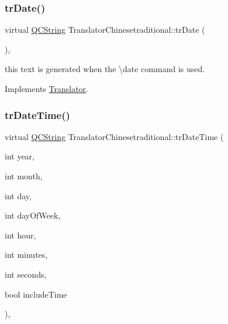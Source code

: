 \mbox{\label{class_translator_chinesetraditional_ab03266211496908f24b94b4b3143ddb9}} 
\subsubsection{\texorpdfstring{trDate()}{trDate()}}
{\footnotesize\ttfamily virtual \mbox{\hyperlink{class_q_c_string}{Q\+C\+String}} Translator\+Chinesetraditional\+::tr\+Date (\begin{DoxyParamCaption}{ }\end{DoxyParamCaption})\hspace{0.3cm}{\ttfamily [inline]}, {\ttfamily [virtual]}}

this text is generated when the \textbackslash{}date command is used. 

Implements \mbox{\hyperlink{class_translator}{Translator}}.

\mbox{\label{class_translator_chinesetraditional_a8c32275e7278645b252fdf1a54dd4875}} 
\subsubsection{\texorpdfstring{trDateTime()}{trDateTime()}}
{\footnotesize\ttfamily virtual \mbox{\hyperlink{class_q_c_string}{Q\+C\+String}} Translator\+Chinesetraditional\+::tr\+Date\+Time (\begin{DoxyParamCaption}\item[{int}]{year,  }\item[{int}]{month,  }\item[{int}]{day,  }\item[{int}]{day\+Of\+Week,  }\item[{int}]{hour,  }\item[{int}]{minutes,  }\item[{int}]{seconds,  }\item[{bool}]{include\+Time }\end{DoxyParamCaption})\hspace{0.3cm}{\ttfamily [inline]}, {\ttfamily [virtual]}}

